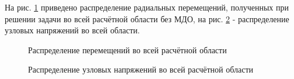 \documentclass[a4paper]{article}
\begin{document}
\newpage

На рис. \ref{fig:task_01_basic_displacement_distribution} приведено распределение радиальных перемещений, полученных при решении задачи во всей расчётной области без МДО, на рис. \ref{fig:task_01_basic_pressure_distribution_y} - распределение узловых напряжений во всей области.

\begin{figure}[h]
\caption{Распределение перемещений во всей расчётной области}
\label{fig:task_01_basic_displacement_distribution}
\end{figure}

\begin{figure}[h]
\caption{Распределение узловых напряжений во всей расчётной области}
\label{fig:task_01_basic_pressure_distribution_y}
\end{figure}
\end{document}
